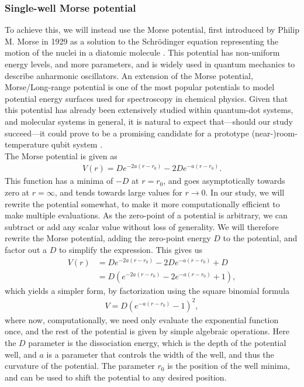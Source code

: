 \documentclass{subfiles}
\begin{document}
\subsubsection*{Single-well Morse potential}
To achieve this, we will instead use the Morse potential, first introduced by Philip M. Morse in 1929 as a solution to the Schrödinger equation representing the motion of the nuclei in a diatomic molecule \cite{morse1929diatomic}. This potential has non-uniform energy levels, and more parameters, and is widely used in quantum mechanics to describe anharmonic oscillators. An extension of the Morse potential, Morse/Long-range potential is one of the most popular potentials to model potential energy surfaces used for spectroscopy \cite{zhai2018constructing} in chemical physics. Given that this potential has already been extensively studied within quantum-dot systems, and molecular systems in general, it is natural to expect that—should our study succeed—it could prove to be a promising candidate for a prototype (near-)room-temperature qubit system \cite{khordad2014linear, hayrapetyan2015exciton, sargsian2021effects}. \\
The Morse potential is given as
\begin{align*}
    V(r) = De^{-2a(r-r_0)} - 2De^{-a(r-r_0)}.
\end{align*}
This function has a minima of $-D$ at $r = r_0$, and goes asymptotically towards zero at $r=\infty$, and tends towards large values for $r\rightarrow0$. In our study, we will rewrite the potential somewhat, to make it more computationally efficient to make multiple evaluations. As the zero-point of a potential is arbitrary, we can subtract or add any scalar value without loss of generality. We will therefore rewrite the Morse potential, adding the zero-point energy $D$ to the potential, and factor out a $D$ to simplify the expression. This gives us
\begin{align*}
    V(r) &= De^{-2a(r-r_0)} - 2De^{-a(r-r_0)} + D \\
    &= D(e^{-2a(r-r_0)} - 2e^{-a(r-r_0)} + 1),
\end{align*}
which yields a simpler form, by factorization using the square binomial formula
\begin{align}
    V = D(e^{-a(r-r_0)} - 1)^2\label{eq:morse_potential},
\end{align}
where now, computationally, we need only evaluate the exponential function once, and the rest of the potential is given by simple algebraic operations. Here the $D$ parameter is the dissociation energy, which is the depth of the potential well, and $a$ is a parameter that controls the width of the well, and thus the curvature of the potential. The parameter $r_0$ is the position of the well minima, and can be used to shift the potential to any desired position.\\
\end{document}
